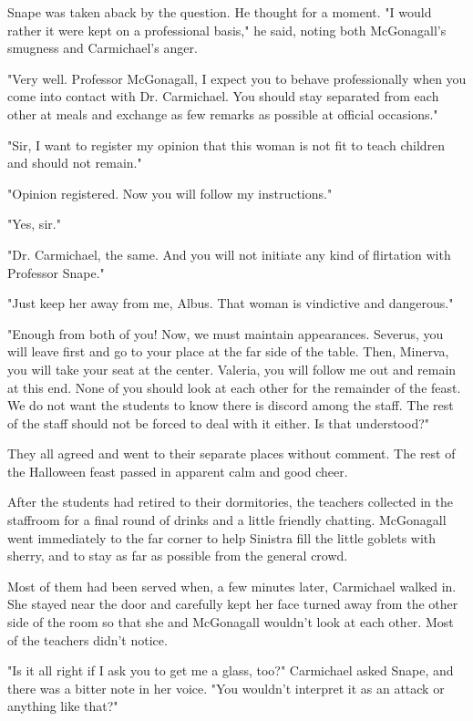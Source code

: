 Snape was taken aback by the question. He thought for a moment. "I would rather it were kept on a professional basis," he said, noting both McGonagall's smugness and Carmichael's anger.

"Very well. Professor McGonagall, I expect you to behave professionally when you come into contact with Dr. Carmichael. You should stay separated from each other at meals and exchange as few remarks as possible at official occasions."

"Sir, I want to register my opinion that this woman is not fit to teach children and should not remain."

"Opinion registered. Now you will follow my instructions."

"Yes, sir."

"Dr. Carmichael, the same. And you will not initiate any kind of flirtation with Professor Snape."

"Just keep her away from me, Albus. That woman is vindictive and dangerous."

"Enough from both of you! Now, we must maintain appearances. Severus, you will leave first and go to your place at the far side of the table. Then, Minerva, you will take your seat at the center. Valeria, you will follow me out and remain at this end. None of you should look at each other for the remainder of the feast. We do not want the students to know there is discord among the staff. The rest of the staff should not be forced to deal with it either. Is that understood?"

They all agreed and went to their separate places without comment. The rest of the Halloween feast passed in apparent calm and good cheer.

After the students had retired to their dormitories, the teachers collected in the staffroom for a final round of drinks and a little friendly chatting. McGonagall went immediately to the far corner to help Sinistra fill the little goblets with sherry, and to stay as far as possible from the general crowd.

Most of them had been served when, a few minutes later, Carmichael walked in. She stayed near the door and carefully kept her face turned away from the other side of the room so that she and McGonagall wouldn't look at each other. Most of the teachers didn't notice.

"Is it all right if I ask you to get me a glass, too?" Carmichael asked Snape, and there was a bitter note in her voice. "You wouldn't interpret it as an attack or anything like that?"

